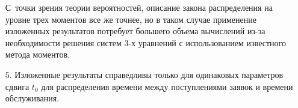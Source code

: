 \begin{enumerate}
С~точки зрения теории вероятностей, описание закона распределения на уровне трех моментов все же точнее, но в таком случае применение изложенных результатов потребует большего объема вычислений из-за необходимости решения систем 3-х уравнений с использованием известного метода моментов.
\item[5.] Изложенные результаты справедливы только для одинаковых параметров сдвига $t_0$ для распределения времени между поступлениями заявок и времени обслуживания.
\end{enumerate}

\smallskip




